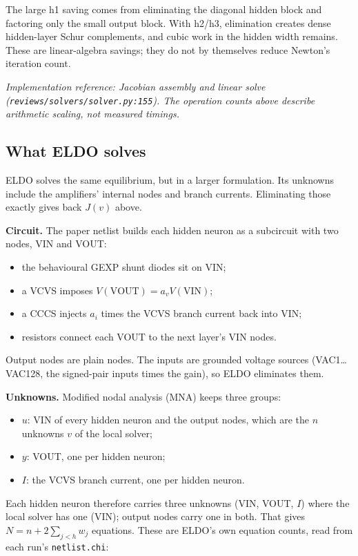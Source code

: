 \documentclass[11pt,a4paper]{article}
\begin{document}
The large h1 saving comes from eliminating the diagonal hidden block and factoring only
the small output block. With h2/h3, elimination creates dense hidden-layer Schur
complements, and cubic work in the hidden width remains. These are linear-algebra
savings; they do not by themselves reduce Newton's iteration count.

\emph{Implementation reference: Jacobian assembly and linear solve
(\nolinkurl{reviews/solvers/solver.py:155}). The operation counts above describe
arithmetic scaling, not measured timings.}

\subsection*{What ELDO solves}

ELDO solves the same equilibrium, but in a larger formulation. Its unknowns include the
amplifiers' internal nodes and branch currents. Eliminating those exactly gives back
$J(v)$ above.

\textbf{Circuit.} The paper netlist builds each hidden neuron as a subcircuit with two
nodes, VIN and VOUT:

\begin{itemize}
\item the behavioural GEXP shunt diodes sit on VIN;
\item a VCVS imposes $V(\mathrm{VOUT})=a_vV(\mathrm{VIN})$;
\item a CCCS injects $a_i$ times the VCVS branch current back into VIN;
\item resistors connect each VOUT to the next layer's VIN nodes.
\end{itemize}

Output nodes are plain nodes. The inputs are grounded voltage sources
(VAC1\ldots{}VAC128, the signed-pair inputs times the gain), so ELDO eliminates them.

\textbf{Unknowns.} Modified nodal analysis (MNA) keeps three groups:

\begin{itemize}
\item $u$: VIN of every hidden neuron and the output nodes, which are the $n$ unknowns $v$ of
the local solver;
\item $y$: VOUT, one per hidden neuron;
\item $I$: the VCVS branch current, one per hidden neuron.
\end{itemize}

Each hidden neuron therefore carries three unknowns (VIN, VOUT, $I$) where the local
solver has one (VIN); output nodes carry one in both. That gives $N=n+2\sum_{j<h}w_j$
equations. These are ELDO's own equation counts, read from each run's
\nolinkurl{netlist.chi}:
\end{document}
